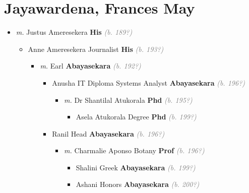 \documentclass[10pt, openany]{book}
\begin{document}
\chapter{Jayawardena, Frances May}
\label{00003335}
\textcolor{slmaroon}{\textit{}}
\begin{itemize}
\item{\textit{m.} Justus Ameresekera \textbf{His} \textcolor{gray}{\textit{(b. 189?)}}   \label{couple:00003335:00003336} \begin{itemize}
\item{Anne Ameresekera Journalist \textbf{His} \textcolor{gray}{\textit{(b. 193?)}}
\begin{itemize}
\item{\textit{m.} Earl \textbf{Abayasekara} \textcolor{gray}{\textit{(b. 192?)}}   \label{couple:00003352:00003353} \begin{itemize}
\item{Anusha  IT Diploma Systems Analyst \textbf{Abayasekara} \textcolor{gray}{\textit{(b. 196?)}}
\begin{itemize}
\item{\textit{m.} Dr Shantilal Atukorala \textbf{Phd} \textcolor{gray}{\textit{(b. 195?)}}   \label{couple:00003381:00003382} \begin{itemize}
\item{Asela Atukorala Degree \textbf{Phd} \textcolor{gray}{\textit{(b. 199?)}}
   }
\end{itemize}}
\end{itemize}
     }
\item{Ranil  Head \textbf{Abayasekara} \textcolor{gray}{\textit{(b. 196?)}}
\begin{itemize}
\item{\textit{m.} Charmalie Aponso Botany \textbf{Prof} \textcolor{gray}{\textit{(b. 196?)}}   \label{couple:00003377:00003378} \begin{itemize}
\item{Shalini  Greek \textbf{Abayasekara} \textcolor{gray}{\textit{(b. 199?)}}
  }
\item{Ashani  Honors \textbf{Abayasekara} \textcolor{gray}{\textit{(b. 200?)}}
  }
\end{itemize}}
\end{itemize}
  }

\end{itemize}}
\end{itemize}}
\end{itemize}}
\end{itemize}
\end{document}
